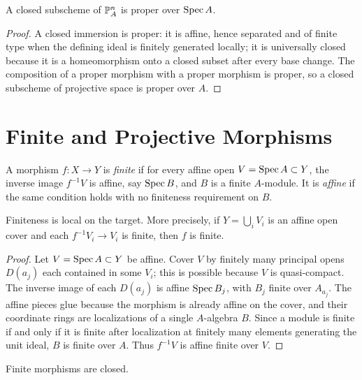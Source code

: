 \begin{corollary}
A closed subscheme of \(\mathbb{P}^n_A\) is proper over \(\operatorname{Spec} A\).
\end{corollary}

\begin{proof}
A closed immersion is proper: it is affine, hence separated and of finite type
when the defining ideal is finitely generated locally; it is universally closed
because it is a homeomorphism onto a closed subset after every base change.
The composition of a proper morphism with a proper morphism is proper, so a
closed subscheme of projective space is proper over \(A\).
\end{proof}

\section{Finite and Projective Morphisms}

\begin{definition}
A morphism \(f:X\to Y\) is \emph{finite} if for every affine open
\(V=\operatorname{Spec} A\subset Y\), the inverse image \(f^{-1}V\) is affine, say
\(\operatorname{Spec} B\), and \(B\) is a finite \(A\)-module.  It is \emph{affine} if the
same condition holds with no finiteness requirement on \(B\).
\end{definition}

\begin{proposition}
Finiteness is local on the target.  More precisely, if \(Y=\bigcup_i V_i\) is
an affine open cover and each \(f^{-1}V_i\to V_i\) is finite, then \(f\) is
finite.
\end{proposition}

\begin{proof}
Let \(V=\operatorname{Spec} A\subset Y\) be affine.  Cover \(V\) by finitely many principal
opens \(D(a_j)\) each contained in some \(V_i\); this is possible because
\(V\) is quasi-compact.  The inverse image of each \(D(a_j)\) is affine
\(\operatorname{Spec} B_j\), with \(B_j\) finite over \(A_{a_j}\).  The affine pieces glue
because the morphism is already affine on the cover, and their coordinate rings
are localizations of a single \(A\)-algebra \(B\).  Since a module is finite if
and only if it is finite after localization at finitely many elements
generating the unit ideal, \(B\) is finite over \(A\).  Thus \(f^{-1}V\) is
affine finite over \(V\).
\end{proof}

\begin{proposition}
Finite morphisms are closed.
\end{proposition}


